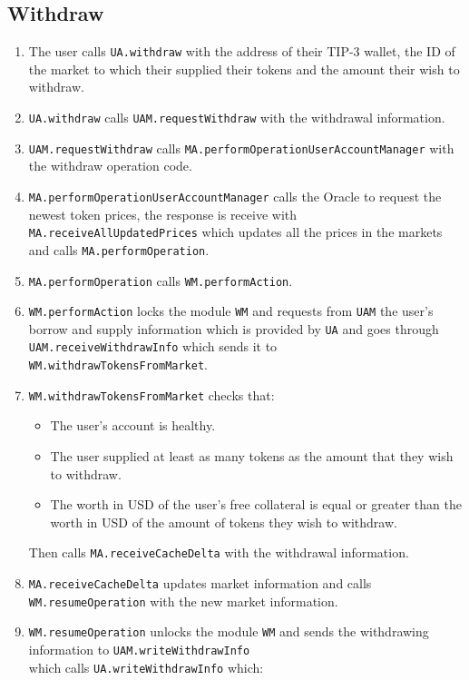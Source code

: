 \subsection{Withdraw}
\begin{enumerate}
  \item The user calls \verb|UA.withdraw| with the address of their TIP-3 wallet, the ID of the market to which their supplied their tokens and the amount their wish to withdraw.
  \item \verb|UA.withdraw| calls \verb|UAM.requestWithdraw| with the withdrawal information.
  \item \verb|UAM.requestWithdraw| calls \verb|MA.performOperationUserAccountManager| with the withdraw operation code.
  \item \verb|MA.performOperationUserAccountManager| calls the Oracle to request the newest token prices, the response is receive with \\\verb|MA.receiveAllUpdatedPrices| which updates all the prices in the markets and calls \verb|MA.performOperation|.
  \item \verb|MA.performOperation| calls \verb|WM.performAction|. 
  \item \verb|WM.performAction| locks the module \verb|WM| and requests from \verb|UAM| the user's borrow and supply information which is provided by \verb|UA| and goes through \verb|UAM.receiveWithdrawInfo| which sends it to \\\verb|WM.withdrawTokensFromMarket|.
  \item \verb|WM.withdrawTokensFromMarket| checks that: 
  \begin{itemize}
    \item The user's account is healthy.
    \item The user supplied at least as many tokens as the amount that they wish to withdraw.
    \item The worth in USD of the user's free collateral is equal or greater than the worth in USD of the amount of tokens they wish to withdraw.  
  \end{itemize}
  Then calls \verb|MA.receiveCacheDelta| with the withdrawal information. 
  \item \verb|MA.receiveCacheDelta| updates market information and calls \\\verb|WM.resumeOperation| with the new market information.
  \item \verb|WM.resumeOperation| unlocks the module \verb|WM| and sends the withdrawing information to \verb|UAM.writeWithdrawInfo| \\which calls \verb|UA.writeWithdrawInfo| which:

\end{enumerate}
